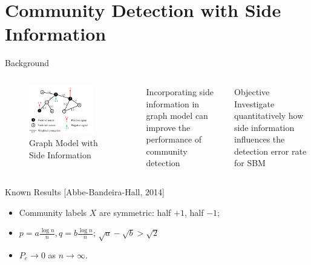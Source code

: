 \documentclass[notheorems]{beamer}
\begin{document}
\section[Side Information]{Community Detection with Side Information}
\begin{frame}
	\tableofcontents[currentsection]
\end{frame}
\begin{frame}{Background}
	\begin{columns}
	\begin{figure}
		\includegraphics[width=0.8\textwidth]{si.png}
		\caption{\scriptsize Graph Model with Side Information}
	\end{figure}
	Incorporating side information in graph model
	can improve the performance of community detection
	\begin{block}{Objective}
		Investigate quantitatively how side information influences
		the detection error rate for SBM
	\end{block}
	\end{columns}
	\begin{block}{Known Results [Abbe-Bandeira-Hall, 2014]}
		\begin{itemize}
		\item Community labels $X$ are symmetric: half $+1$, half $-1$;
		\item $p = a\frac{ \log n}{n}, q = b \frac{ \log n}{n}$;
		$\sqrt{a} - \sqrt{b} > \sqrt{2}$
		\item $P_e \to 0$ as $n \to \infty$.
		\end{itemize}
	\end{block}
\end{frame}
\end{document}
